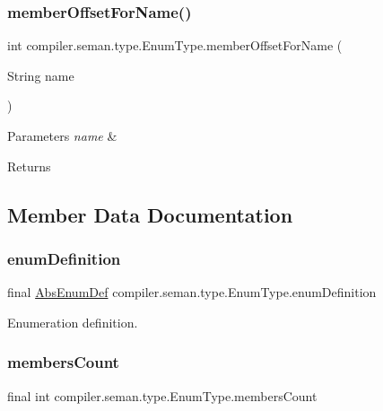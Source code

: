 \subsubsection{\texorpdfstring{member\+Offset\+For\+Name()}{memberOffsetForName()}}
{\footnotesize\ttfamily int compiler.\+seman.\+type.\+Enum\+Type.\+member\+Offset\+For\+Name (\begin{DoxyParamCaption}\item[{String}]{name }\end{DoxyParamCaption})}


\begin{DoxyParams}{Parameters}
{\em name} & \\
\hline
\end{DoxyParams}
\begin{DoxyReturn}{Returns}

\end{DoxyReturn}


\subsection{Member Data Documentation}
\mbox{\label{classcompiler_1_1seman_1_1type_1_1_enum_type_ad64629e424833fae2ec20f48213fee90}} 
\subsubsection{\texorpdfstring{enum\+Definition}{enumDefinition}}
{\footnotesize\ttfamily final \hyperlink{classcompiler_1_1abstr_1_1tree_1_1def_1_1_abs_enum_def}{Abs\+Enum\+Def} compiler.\+seman.\+type.\+Enum\+Type.\+enum\+Definition}

Enumeration definition. \mbox{\label{classcompiler_1_1seman_1_1type_1_1_enum_type_a3579edc052640352e070e33936e09138}} 
\subsubsection{\texorpdfstring{members\+Count}{membersCount}}
{\footnotesize\ttfamily final int compiler.\+seman.\+type.\+Enum\+Type.\+members\+Count}

